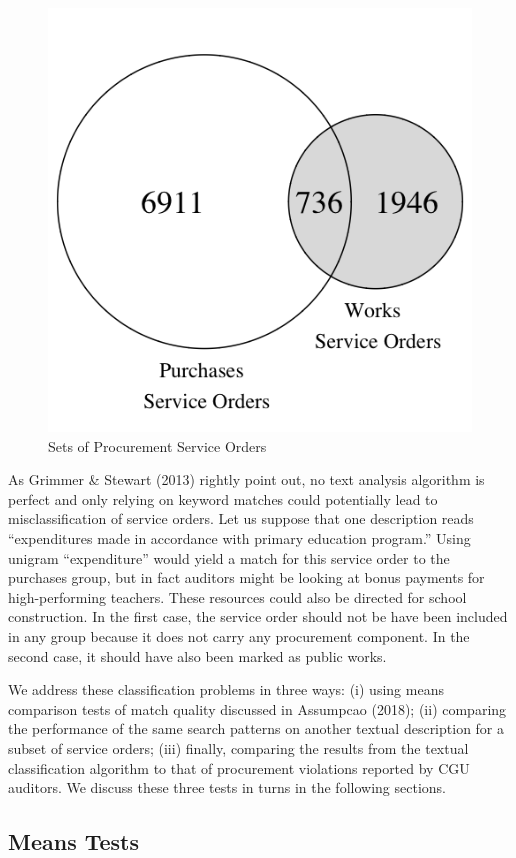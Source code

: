 \documentclass[]{article}
\theoremstyle{definition}
\theoremstyle{definition}
\theoremstyle{definition}
\theoremstyle{remark}
\begin{document}
\begin{figure}[htbp]

{\centering \includegraphics[width=0.3\linewidth]{venn} 

}

\caption{Sets of Procurement Service Orders}\label{fig:venn}
\end{figure}

As Grimmer \& Stewart (2013) rightly point out, no text analysis
algorithm is perfect and only relying on keyword matches could
potentially lead to misclassification of service orders. Let us suppose
that one description reads ``expenditures made in accordance with
primary education program.'' Using unigram ``expenditure'' would yield a
match for this service order to the purchases group, but in fact
auditors might be looking at bonus payments for high-performing
teachers. These resources could also be directed for school
construction. In the first case, the service order should not be have
been included in any group because it does not carry any procurement
component. In the second case, it should have also been marked as public
works.

We address these classification problems in three ways: (i) using means
comparison tests of match quality discussed in Assumpcao (2018); (ii)
comparing the performance of the same search patterns on another textual
description for a subset of service orders; (iii) finally, comparing the
results from the textual classification algorithm to that of procurement
violations reported by CGU auditors. We discuss these three tests in
turns in the following sections.

\hypertarget{quality1}{%
\subsection{Means Tests}\label{quality1}}
\end{document}
